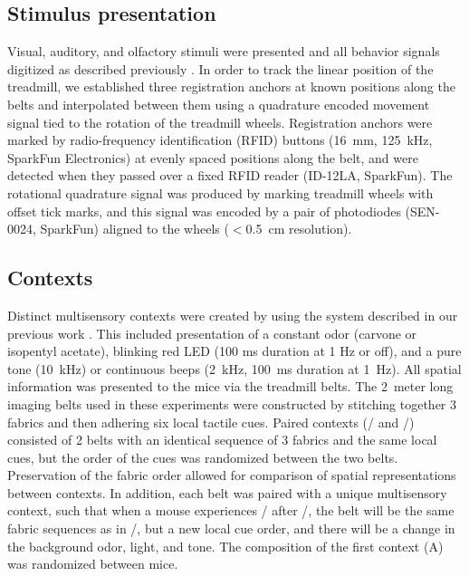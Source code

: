 \subsection{Stimulus presentation}
Visual, auditory, and olfactory stimuli were presented and all behavior signals digitized as described previously \citep{Danielson2016b, Kaifosh2013, Lovett-Barron2014}. In order to track the linear position of the treadmill, we established three registration anchors at known positions along the belts and interpolated between them using a quadrature encoded movement signal tied to the rotation of the treadmill wheels. Registration anchors were marked by radio-frequency identification (RFID) buttons (16~mm, 125~kHz, SparkFun Electronics) at evenly spaced positions along the belt, and were detected when they passed over a fixed RFID reader (ID-12LA, SparkFun).  The rotational quadrature signal was produced by marking treadmill wheels with offset tick marks, and this signal was encoded by a pair of photodiodes (SEN-0024, SparkFun) aligned to the wheels ($<$0.5~cm resolution).
\subsection{Contexts}\label{sec:df:methods:contexts}
Distinct multisensory contexts were created by using the system described in our previous work \citep{Lovett-Barron2014}. This included presentation of a constant odor (carvone or isopentyl acetate), blinking red LED (100 ms duration at 1 Hz or off), and a pure tone (10~kHz) or continuous beeps (2~kHz, 100~ms duration at 1~Hz). All spatial information was presented to the mice via the treadmill belts. The 2~meter long imaging belts used in these experiments were constructed by stitching together 3 fabrics and then adhering six local tactile cues. Paired contexts (\A/ and \Aprime/) consisted of 2 belts with an identical sequence of 3 fabrics and the same local cues, but the order of the cues was randomized between the two belts. Preservation of the fabric order allowed for comparison of spatial representations between contexts. In addition, each belt was paired with a unique multisensory context, such that when a mouse experiences \Aprime/ after \A/, the belt will be the same fabric sequences as in \A/, but a new local cue order, and there will be a change in the background odor, light, and tone. The composition of the first context (A) was randomized between mice.
